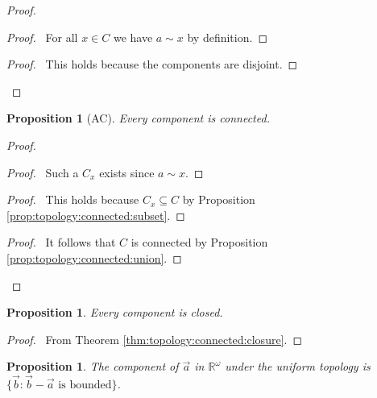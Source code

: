 \documentclass{report}
\let\qed\relax
\newtheorem{prop}[lm]{Proposition}
\theoremstyle{definition}
\begin{document}
  \begin{proof}
    \pf
    \begin{proof}
      \pf\ For all $x \in C$ we have $a \sim x$ by definition.
    \end{proof}
    \begin{proof}
      \pf\ This holds because the components are disjoint.
    \end{proof}
    \qed
  \end{proof}


  \begin{prop}[AC]
    \label{prop:topology:component:connected}
    Every component is connected.
  \end{prop}

  \begin{proof}
    \pf
    \begin{proof}
      \pf\ Such a $C_x$ exists since $a \sim x$.
    \end{proof}
    \begin{proof}
      \pf\ This holds because $C_x \subseteq C$ by Proposition
      \ref{prop:topology:connected:subset}.
    \end{proof}
    \qedstep
    \begin{proof}
      \pf\ It follows that $C$ is connected by Proposition
      \ref{prop:topology:connected:union}.
    \end{proof}
    \qed
  \end{proof}

  \begin{prop}
    Every component is closed.
  \end{prop}

  \begin{proof}
    \pf\ From Theorem \ref{thm:topology:connected:closure}. \qed
  \end{proof}

   \begin{prop}
   The component of $\vec{a}$ in $\mathbb{R}^\omega$ under the uniform topology
   is $\{ \vec{b} : \vec{b} - \vec{a} \text{ is bounded} \}$.
 \end{prop}
\end{document}
